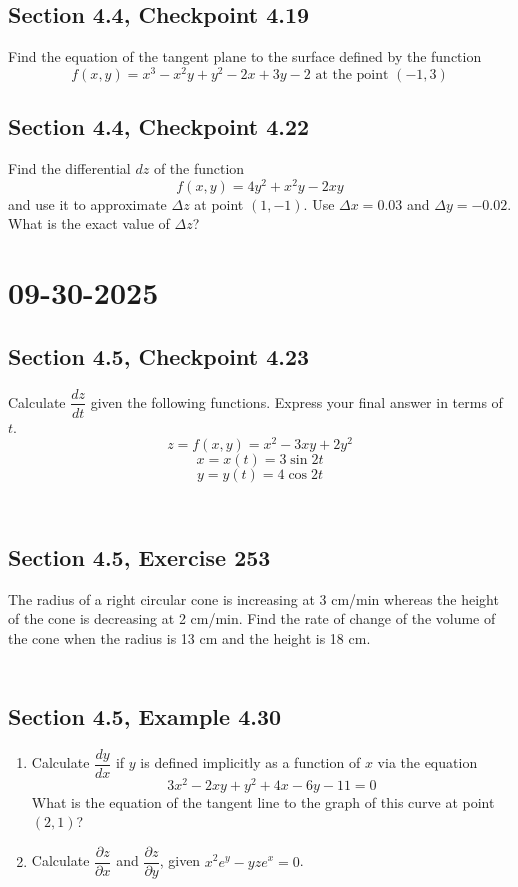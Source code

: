 \documentclass[]{mangos-musings}
\begin{document}
\subsection{Section 4.4, Checkpoint 4.19}
Find the equation of the tangent plane to the surface defined by the function 
\[f(x, y) = x^3 - x^2 y + y^2 - 2x + 3y - 2 \text{ at the point }(-1, 3)\]

\newpage
\subsection{Section 4.4, Checkpoint 4.22}
Find the differential $dz$ of the function 
\[f(x, y) = 4y^2 + x^2 y - 2xy\]
and use it to approximate $\Delta z$ at point $(1, -1)$. Use $\Delta x = 0.03$ and $\Delta y = -0.02$.
What is the exact value of $\Delta z$?


\newpage
\section{09-30-2025}
\subsection{Section 4.5, Checkpoint 4.23}
Calculate $\dfrac{dz}{dt}$ given the following functions. Express your final answer in terms of $t$.
\[z = f(x, y) = x^2 - 3xy + 2y^2\]
\[x = x(t) = 3\sin 2t\]
\[y = y(t) = 4\cos 2t\]
\begin{align*}
  \\ \\ \\ \\
\end{align*}
\subsection{Section 4.5, Exercise 253}
The radius of a right circular cone is increasing at 3
cm/min whereas the height of the cone is decreasing at 2 cm/min. 
Find the rate of change of the volume of the cone when the radius is 13 cm and the height is 18 cm.
\begin{align*}
  \\ \\ \\
\end{align*}
\subsection{Section 4.5, Example 4.30}
\begin{enumerate}[label=(\alph*)]
  \item Calculate $\dfrac{dy}{dx}$ if $y$ is defined implicitly as a function of $x$ via the equation 
  \[3x^2 - 2xy + y^2 + 4x - 6y - 11 = 0\]
  What is the equation of the tangent line to the graph of this curve at point $(2, 1)$?
  \item Calculate $\dfrac{\partial z}{\partial x}$ and $\dfrac{\partial z}{\partial y}$, given $x^2e^y - yze^x = 0$.
\end{enumerate}
\end{document}

